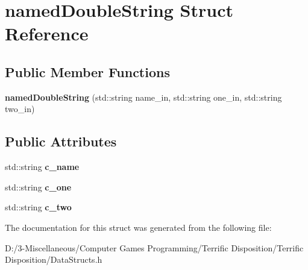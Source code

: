 \hypertarget{structnamed_double_string}{}\section{named\+Double\+String Struct Reference}
\label{structnamed_double_string}
\subsection*{Public Member Functions}
\begin{DoxyCompactItemize}
\item 
\mbox{\label{structnamed_double_string_a1d6e4e26396dc9e02aab39632423d1de}} 
{\bfseries named\+Double\+String} (std\+::string name\+\_\+in, std\+::string one\+\_\+in, std\+::string two\+\_\+in)
\end{DoxyCompactItemize}
\subsection*{Public Attributes}
\begin{DoxyCompactItemize}
\item 
\mbox{\label{structnamed_double_string_a07b9b0a326aac1b80b9e0a0c64543301}} 
std\+::string {\bfseries c\+\_\+name}
\item 
\mbox{\label{structnamed_double_string_a8f165bb12c5a0444d5745ededddf7463}} 
std\+::string {\bfseries c\+\_\+one}
\item 
\mbox{\label{structnamed_double_string_a18e13dd8a7350f5ac707da52d9b18251}} 
std\+::string {\bfseries c\+\_\+two}
\end{DoxyCompactItemize}


The documentation for this struct was generated from the following file\+:\begin{DoxyCompactItemize}
\item 
D\+:/3-\/\+Miscellaneous/\+Computer Games Programming/\+Terrific Disposition/\+Terrific Disposition/Data\+Structs.\+h\end{DoxyCompactItemize}
